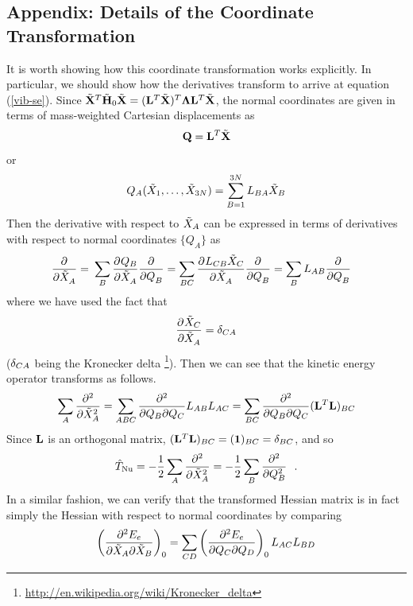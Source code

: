 \documentclass[11pt]{article}
\begin{document}
\newpage
\subsection{Appendix: Details of the Coordinate Transformation}
It is worth showing how this coordinate transformation works explicitly. In
particular, we should show how the derivatives transform to arrive at equation
(\ref{vib-se}). Since $\tilde{\mathbf{X}}^T \tilde{\mathbf{H}}_0 \tilde{\mathbf{X}} = (\mathbf{L}^T
\tilde{\mathbf{X}})^T \bm{\Lambda} \mathbf{L}^T \tilde{\mathbf{X}}$, the normal coordinates are given
in terms of mass-weighted Cartesian displacements as
\begin{align*}
    \mathbf{Q}
=
    \mathbf{L}^T\tilde{\mathbf{X}}
\end{align*}
or
\begin{align}
%
    Q_A(\tl{X}_1,\ld,\tl{X}_{3N})
=
\sum_{B=1}^{3N}
    L_{BA}
    \tl{X}_B
\end{align}
Then the derivative with respect to $\tilde{X}_A$ can be expressed in terms of
derivatives with respect to normal coordinates $\{Q_A\}$ as
\begin{align}
\label{derivative-transform}
%
    \pd{}{}{\tl{X}_A}
=&\
\sum_B
    \pd{}{Q_B}{\tl{X}_A}\pd{}{}{Q_B}
=
\sum_{BC}
    \pd{}{L_{CB}\tl{X}_C}{\tl{X}_A}\pd{}{}{Q_B}
=
\sum_{B}
    L_{AB}\pd{}{}{Q_B}
\end{align}
where we have used the fact that
\begin{align*}
 \dfrac{ \partial^{} \tilde{X}_C }{\partial \tilde{X}_A ^{}}=\delta_{CA}
\end{align*}
($\delta_{CA}$ being the Kronecker delta
\footnote{\url{http://en.wikipedia.org/wiki/Kronecker_delta}}). Then we can see
that the kinetic energy operator transforms as follows.
\begin{align*}
\sum_A
     \dfrac{ \partial^{2}  }{\partial \tilde{X}_A ^{2}}
=
\sum_{ABC}
    \dfrac{\partial^2}{\partial Q_B\partial Q_C}
    L_{AB}L_{AC}
=
\sum_{BC}
    \dfrac{\partial^2}{\partial Q_B\partial Q_C}
    (\mathbf{L}^T\mathbf{L})_{BC}
\end{align*}
Since $\mathbf{L}$ is an orthogonal matrix,
$(\mathbf{L}^T\mathbf{L})_{BC}=(\mathbf{1})_{BC}=\delta_{BC}$, and so
\begin{align}
%
    \op{T}_\Nu
=
-\fr{1}{2}\sum_A
    \pd{2}{}{\tl{X}_A}
=
-\fr{1}{2}\sum_B
    \pd{2}{}{Q_B} \ \ .
\end{align}
In a similar fashion, we can verify that the transformed Hessian matrix is in
fact simply the Hessian with respect to normal coordinates by comparing
\begin{align*}
%
    \pr{\fr{\pt^2E_e}{\pt\tl{X}_A\pt\tl{X}_B}}_0
=
\sum_{CD}
    \pr{\fr{\pt^2E_e}{\pt Q_C\pt Q_D}}_0
    L_{AC}L_{BD}
\end{align*}
\end{document}
